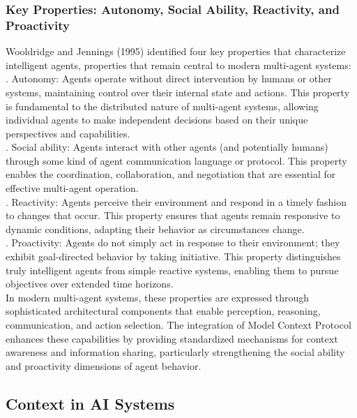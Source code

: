 \subsubsection{Key Properties: Autonomy, Social Ability, Reactivity, and Proactivity}
Wooldridge and Jennings (1995) identified four key properties that characterize intelligent agents, properties that remain central to modern multi-agent systems:\\ . Autonomy: Agents operate without direct intervention by humans or other systems, maintaining control over their internal state and actions. This property is fundamental to the distributed nature of multi-agent systems, allowing individual agents to make independent decisions based on their unique perspectives and capabilities.\\ . Social ability: Agents interact with other agents (and potentially humans) through some kind of agent communication language or protocol. This property enables the coordination, collaboration, and negotiation that are essential for effective multi-agent operation.\\ . Reactivity: Agents perceive their environment and respond in a timely fashion to changes that occur. This property ensures that agents remain responsive to dynamic conditions, adapting their behavior as circumstances change.\\ . Proactivity: Agents do not simply act in response to their environment; they exhibit goal-directed behavior by taking initiative. This property distinguishes truly intelligent agents from simple reactive systems, enabling them to pursue objectives over extended time horizons.\\ \newline
In modern multi-agent systems, these properties are expressed through sophisticated architectural components that enable perception, reasoning, communication, and action selection. The integration of Model Context Protocol enhances these capabilities by providing standardized mechanisms for context awareness and information sharing, particularly strengthening the social ability and proactivity dimensions of agent behavior.\\
\subsection{Context in AI Systems}
